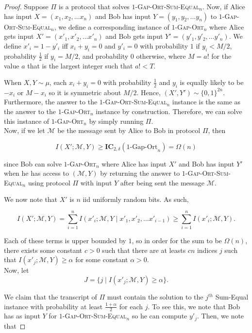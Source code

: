 \documentclass[11pt]{article}
\numberwithin{equation}{section}
\theoremstyle{definition}
\theoremstyle{plain}
\newcommand{\ic}{\ensuremath{\mathbf{IC}}}
\newcommand{\go}{\textsc{Gap-Ort}}
\newcommand{\gose}{\textsc{Gap-Ort-Sum-Equal}}
\begin{document}
\begin{proof}
Suppose $\Pi$ is a protocol that solves $1$-\gose$_n$. Now, if Alice has input $X = (x_1, x_2, \dots x_n)$ and Bob has input $Y = (y_1, y_2, \dots y_n)$ to $1$-\gose$_n$, we define a corresponding instance of $1$-\go$_n$ where Alice gets input $X' = (x'_1, x'_2, \dots x'_n)$ and Bob gets input $Y' = (y'_1, y'_2, \dots y'_n)$. {\color{black}We define $x'_i = 1-y'_i$ iff $x_i+y_i = 0$ and $y'_i = 0$ with probability $1$ if $y_i < M/2$, probability $\frac{1}{2}$ if $y_i=M/2$, and probability $0$ otherwise, where $M = a!$ for the value $a$ that is the largest integer such that $a! < T$.}

When $X,Y \sim \mu$, each $x_i+y_i = 0$ with probability $\frac{1}{2}$ and $y_i$ is equally likely to be $-x_i$ or $M-x_i$ so it is symmetric about $M/2$. Hence, $(X',Y') \sim \{0,1\}^{2n}$. Furthermore, the answer to the $1$-\gose$_n$ instance is the same as the answer to the $1$-\go$_n$ instance by construction. Therefore, we can solve this instance of $1$-\go$_n$ by simply running $\Pi$.\\

Now, if we let $\mathcal{M}$ be the message sent by Alice to Bob in protocol $\Pi$, then

$$I(X' ; \mathcal{M}, Y) \ge \ic_{2,\delta}(1\text{-Gap-Ort}_n) = \Omega(n)$$

since Bob can solve $1$-\go$_n$ where Alice has input $X'$ and Bob has input $Y'$ when he has access to $(\mathcal{M},Y)$ by returning the answer to $1$-\gose$_n$ using protocol $\Pi$ with input $Y$ after being sent the message $\mathcal{M}$.

We now note that $X'$ is $n$ iid uniformly random bits. As such,

$$I(X' ; \mathcal{M}, Y) = \sum_{i=1}^n I(x'_i;\mathcal{M}, Y \mid x'_1, x'_2, \dots x'_{i-1}) \ge \sum_{i=1}^n I(x'_i;\mathcal{M}, Y).$$

Each of these terms is upper bounded by $1$, so in order for the sum to be $\Omega(n)$, there exists some constant $c>0$ such that there are at leasts $cn$ indices $j$ such that $I(x'_j;\mathcal{M}, Y) 
\ge \alpha$ for some constant $\alpha > 0$.\\

Now, let
$$J = \{j \mid I(x'_j;\mathcal{M}, Y) \ge \alpha\}.$$

We claim that the transcript of $\Pi$ must contain the solution to the $j^{th}$ Sum-Equal instance with probability {\color{black}at least $\frac{1+\alpha}{2}$} for each $j$. To see this, we note that Bob has as input $Y$ for $1$-\gose$_n$ so he can compute $y'_j$. Then, we note that


\end{proof}
\end{document}
